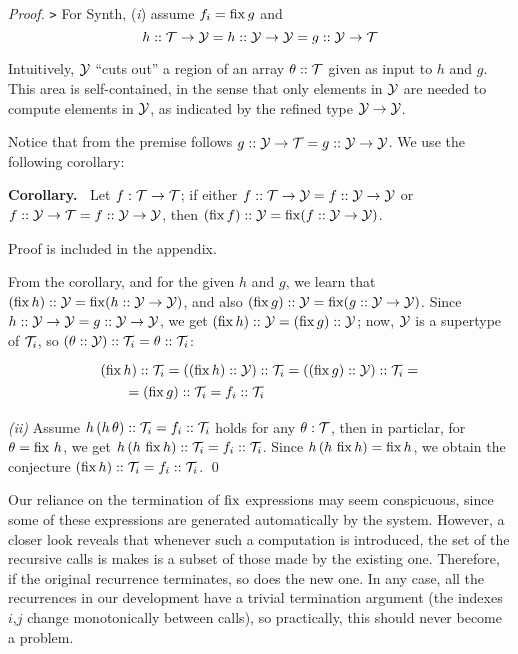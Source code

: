 \begin{proof}
\medskip
\noindent
{\tt >} For {\sf Synth}, ({\it i}) assume $f_i=\operatorname{fix} g$ and
\[h :: \mathcal{T}\to\mathcal{Y} = h :: \mathcal{Y}\to\mathcal{Y} = g :: \mathcal{Y}\to\mathcal{T}\]

Intuitively, $\mathcal{Y}$ ``cuts out'' a region of an array $\theta :: \mathcal{T}$ given
as input to $h$ and $g$. This area is self-contained, in the sense that
only elements in $\mathcal{Y}$ are needed to compute elements in $\mathcal{Y}$, as indicated
by the refined type $\mathcal{Y}\to\mathcal{Y}$.

Notice that from the premise follows $g :: \mathcal{Y}\to\mathcal{T} = g :: \mathcal{Y}\to\mathcal{Y}$. We use the following corollary:

\medskip\noindent
{\bf Corollary.~} Let $f : \mathcal{T}\to\mathcal{T}$; if either $f :: \mathcal{T}\to\mathcal{Y} = f :: \mathcal{Y}\to\mathcal{Y}$ or $f :: \mathcal{Y}\to\mathcal{T} = f :: \mathcal{Y}\to\mathcal{Y}$, 
then $(\operatorname{fix} f)::\mathcal{Y} = \operatorname{fix} (f :: \mathcal{Y}\to\mathcal{Y})$.

Proof is included in the appendix.

\medskip
From the corollary, and for the given $h$ and $g$, we learn that $(\operatorname{fix} h)::\mathcal{Y} = \operatorname{fix}(h::\mathcal{Y}\to\mathcal{Y})$,
and also $(\operatorname{fix} g)::\mathcal{Y}=\operatorname{fix}(g::\mathcal{Y}\to\mathcal{Y})$. Since $h::\mathcal{Y}\to\mathcal{Y}=g::\mathcal{Y}\to\mathcal{Y}$,
we get $(\operatorname{fix} h)::\mathcal{Y} = (\operatorname{fix} g)::\mathcal{Y}$; now, $\mathcal{Y}$ is a supertype of $\mathcal{T}_i$, so $(\theta::\mathcal{Y})::\mathcal{T}_i=\theta::\mathcal{T}_i$:
\[\renewcommand\arraystretch{1.3}
  \begin{array}{l}(\fix h)::\T_i = ((\fix h)::\Y)::\T_i = ((\fix g)::\Y)::\T_i = \\
    \qquad = (\fix g)::\T_i=f_i::\T_i
  \end{array}\]

{\it (ii)} Assume $h\,(h\,\theta) :: \mathcal{T}_i = f_i :: \mathcal{T}_i$ holds for any $\theta:\mathcal{T}$,
then in particlar, for $\theta=\operatorname{fix}\,h$, we get $h\,(h\,\operatorname{fix} h) :: \mathcal{T}_i = f_i :: \mathcal{T}_i$.
Since $h\,(h\,\operatorname{fix} h) = \operatorname{fix} h$, we obtain the conjecture $(\operatorname{fix} h) :: \mathcal{T}_i = f_i :: \mathcal{T}_i$.
\qed
\end{proof}

\medskip
Our reliance on the termination of $\operatorname{fix}$ expressions may seem conspicuous, since some of these
expressions are generated automatically by the system. However, a closer look reveals that whenever
such a computation is introduced, the set of the recursive calls is makes is a subset of those made by the existing one.
Therefore, if the original recurrence terminates, so does the new one. In any case, all the recurrences
in our development have a trivial termination argument (the indexes $i$,$j$ change monotonically between calls),
so practically, this should never become a problem.

\newcommand\vtyped[2]{\underset{\scriptscriptstyle ( #2 )}{ #1 }}

